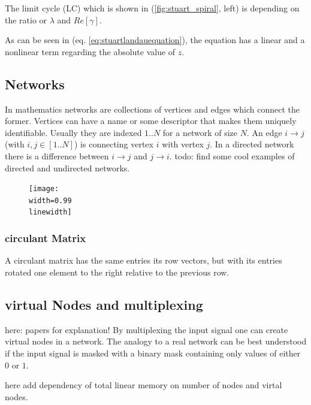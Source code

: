 The limit cycle (LC) which is shown in (\ref{fig:stuart_spiral}, left) is depending on the ratio or $\lambda$ and $Re \left[\gamma \right]$. 





As can be seen in (eq. \ref{eq:stuartlandauequation}), the equation has a linear and a nonlinear term regarding the absolute value of $z$.

\subsection{Networks}

In mathematics networks are collections of vertices and edges which connect the former. Vertices can have a name or some descriptor that makes them uniquely identifiable. Usually they are indexed $1..N$ for a network of size $N$. An edge $i \rightarrow j $ (with $i,j \in [1..N]$) is connecting vertex $i$ with vertex $j$. In a directed network there is a difference between $i \rightarrow j $ and $j \rightarrow i$. 
todo: find some cool examples of directed and undirected networks.

\begin{figure}
	\texttt{[image: \\width=0.99\\linewidth]}{
	}
\end{figure}


	\subsubsection{circulant Matrix}
    A circulant matrix has the same entries its row vectors, but with its entries rotated one element to the right relative to the previous row.
    
\subsection{virtual Nodes and multiplexing}
	here: papers for explanation!
	By multiplexing the input signal one can create virtual nodes in a network. The analogy to a real network can be best understood if the input signal is masked with a binary mask containing only values of either $0$ or $1$. 
	
	here add dependency of total linear memory on number of nodes and virtal nodes.

